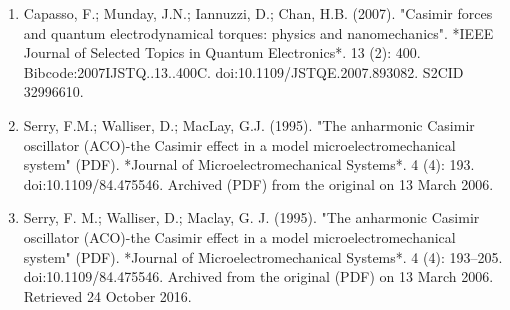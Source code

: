 \begin{enumerate}
\item Capasso, F.; Munday, J.N.; Iannuzzi, D.; Chan, H.B. (2007). "Casimir forces and quantum electrodynamical torques: physics and nanomechanics". *IEEE Journal of Selected Topics in Quantum Electronics*. 13 (2): 400. Bibcode:2007IJSTQ..13..400C. doi:10.1109/JSTQE.2007.893082. S2CID 32996610.
\item Serry, F.M.; Walliser, D.; MacLay, G.J. (1995). "The anharmonic Casimir oscillator (ACO)-the Casimir effect in a model microelectromechanical system" (PDF). *Journal of Microelectromechanical Systems*. 4 (4): 193. doi:10.1109/84.475546. Archived (PDF) from the original on 13 March 2006.
\item Serry, F. M.; Walliser, D.; Maclay, G. J. (1995). "The anharmonic Casimir oscillator (ACO)-the Casimir effect in a model microelectromechanical system" (PDF). *Journal of Microelectromechanical Systems*. 4 (4): 193–205. doi:10.1109/84.475546. Archived from the original (PDF) on 13 March 2006. Retrieved 24 October 2016.
\end{enumerate}